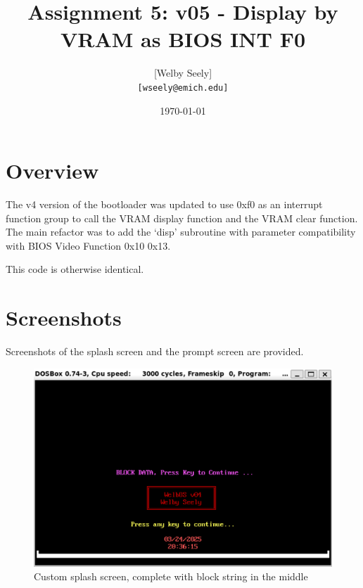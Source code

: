 \documentclass{article}
\title{Assignment 5: v05 - Display by VRAM as BIOS INT F0}
\author{
    [Welby Seely] \\
    \texttt{[wseely@emich.edu]}
}
\date{\today}
\begin{document}
    \maketitle
    \section{Overview}\label{sec:intro}
    The v4 version of the bootloader was updated to use 0xf0 as an interrupt function group to call the VRAM display function and the VRAM clear function.
    The main refactor was to add the `disp' subroutine with parameter compatibility with BIOS Video Function 0x10 0x13.

    This code is otherwise identical.


    \section{Screenshots}\label{sec:screenshots}
    Screenshots of the splash screen and the prompt screen are provided.

    \begin{figure}[H]  %
        \centering
        \includegraphics[width=\textwidth]{splash-screen} %
        \caption{Custom splash screen, complete with block string in the middle}
        \label{fig:1}
    \end{figure}
\end{document}
